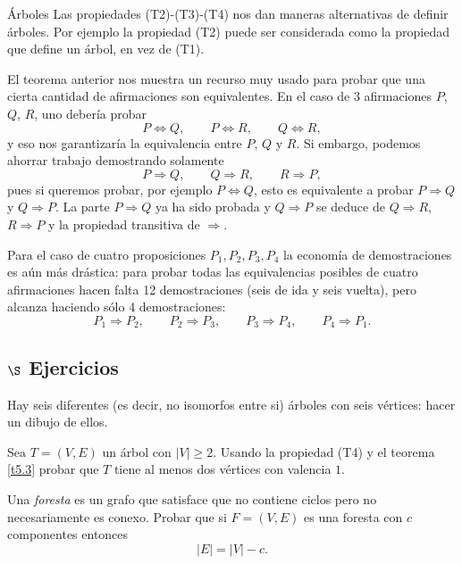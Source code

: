 \begin{section}{Árboles}
Las propiedades (T2)-(T3)-(T4) nos dan maneras alternativas de definir árboles. Por ejemplo la propiedad (T2) puede ser considerada como la propiedad que define un árbol, en vez de (T1). 

\begin{observacion*}
El teorema anterior nos muestra un recurso muy usado para probar que una cierta cantidad de afirmaciones son equivalentes. En el caso de $3$ afirmaciones $P$, $Q$, $R$, uno debería probar
$$
P \Leftrightarrow Q,\qquad P \Leftrightarrow R,\qquad Q \Leftrightarrow R,
$$
y eso nos garantizaría la equivalencia entre $P$, $Q$ y $R$. Si embargo, podemos ahorrar trabajo demostrando solamente
$$
P \Rightarrow Q,\qquad Q \Rightarrow R,\qquad R \Rightarrow P,
$$  
pues si queremos probar, por ejemplo $P \Leftrightarrow Q$, esto es equivalente a probar $P \Rightarrow Q$ y $Q \Rightarrow P$. La parte $P \Rightarrow Q$ ya ha sido probada y $Q \Rightarrow P$ se deduce de $Q \Rightarrow R$, $R \Rightarrow P$ y la propiedad transitiva de $\Rightarrow$. 

Para el caso de cuatro proposiciones $P_1,P_2,P_3,P_4$ la economía de demostraciones es aún más drástica: para probar todas las equivalencias posibles de cuatro afirmaciones hacen falta 12 demostraciones (seis de ida y seis vuelta), pero alcanza haciendo sólo 4 demostraciones:
$$
P_1 \Rightarrow P_2,\qquad P_2 \Rightarrow P_3,\qquad P_3 \Rightarrow P_4,\qquad P_4 \Rightarrow P_1. 
$$ 
\end{observacion*}

\subsection*{$\S$ Ejercicios}\label{ejercicios5.5}
\begin{enumex}
\item \label{ejercicio5.5.1} Hay seis diferentes (es decir, no isomorfos entre si) árboles con
seis vértices: hacer un dibujo de ellos.
\item Sea $T=(V,E)$ un árbol con $|V| \ge 2$. Usando la propiedad (T4) y el teorema
\ref{t5.3}
probar que $T$ tiene al menos dos vértices con valencia $1$.
\item Una \textit{foresta} es un grafo que satisface que no contiene ciclos pero no
necesariamente es conexo. Probar que si $F=(V,E)$ es una foresta con
$c$ componentes entonces
$$
|E|=|V|-c.
$$
\end{enumex}

\end{section}


